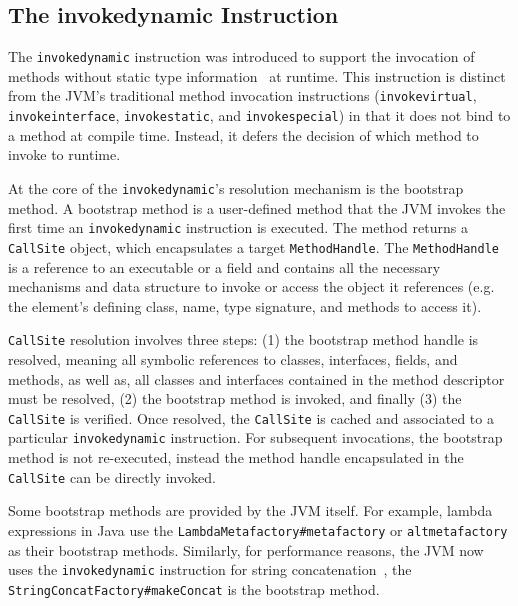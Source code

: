 

\subsection{The  invokedynamic Instruction}
The \verb|invokedynamic| instruction was introduced to support the invocation of methods without static type information~\cite{noauthor_java_nodate} at runtime.
This instruction is distinct from the JVM's traditional method invocation instructions (\verb|invokevirtual|, \verb|invokeinterface|, \verb|invokestatic|, and \verb|invokespecial|) in that it does not bind to a method at compile time. Instead, it defers the decision of which method to invoke to runtime.

At the core of the \verb|invokedynamic|'s resolution mechanism is the bootstrap method. A bootstrap method is a user-defined method that the JVM invokes the first time an \verb|invokedynamic| instruction is executed. 
The method returns a \verb|CallSite| object, which encapsulates a target \verb|MethodHandle|. The \verb|MethodHandle| is a reference to an executable or a field and contains all the necessary mechanisms and data structure to invoke or access the object it references (e.g. the element's defining class, name, type signature, and methods to access it). 

\verb|CallSite| resolution involves three steps: (1) the bootstrap method handle is resolved, meaning all symbolic references to classes, interfaces, fields, and methods, as well as, all classes and interfaces contained in the method descriptor must be resolved, (2) the bootstrap method is invoked, and finally (3) the \verb|CallSite| is verified.
Once resolved, the \verb|CallSite| is cached and associated to a particular \verb|invokedynamic| instruction.
For subsequent invocations, the bootstrap method is not re-executed, instead the method handle encapsulated in the \verb|CallSite| can be directly invoked.

Some bootstrap methods are provided by the JVM itself. For example, lambda expressions in Java use the \verb|LambdaMetafactory#metafactory| or \verb|altmetafactory| as their bootstrap methods. Similarly, for performance reasons, the JVM now uses the \verb|invokedynamic| instruction for string concatenation~\cite{noauthor_jep_nodate-1}, the \verb|StringConcatFactory#makeConcat| is the bootstrap method.

